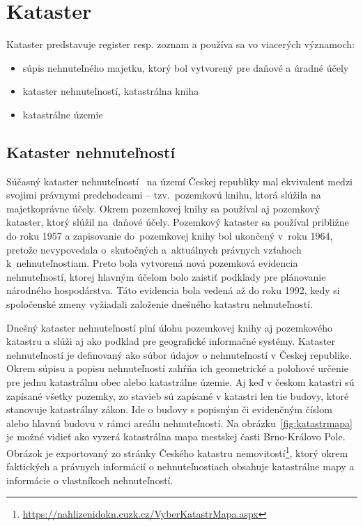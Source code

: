 \section{Kataster}
Kataster predstavuje register resp. zoznam a používa sa vo viacerých významoch:
\begin{itemize}
    \item súpis nehnuteľného majetku, ktorý bol vytvorený pre daňové a úradné účely
    \item kataster nehnuteľností, katastrálna kniha
    \item katastrálne územie
\end{itemize}

\subsection{Kataster nehnuteľností}
Súčasný kataster nehnuteľností~\cite{baudys-katastranemovitosti} na území Českej republiky mal ekvivalent medzi svojimi právnymi predchodcami \--- tzv.~pozemkovú knihu, ktorá slúžila na majetkoprávne účely. Okrem pozemkovej knihy sa používal aj pozemkový kataster, ktorý slúžil na~daňové účely. Pozemkový kataster sa používal približne do roku 1957 a zapisovanie do~pozemkovej knihy bol ukončený v~roku 1964, pretože nevypovedala o~skutočných a~aktuálnych právnych vzťahoch k~nehnuteľnostiam. Preto bola vytvorená nová pozemková evidencia nehnuteľností, ktorej hlavným účelom bolo zaistiť podklady pre plánovanie národného hospodárstva. Táto evidencia bola vedená až do roku 1992, kedy si spoločenské zmeny vyžiadali založenie dnešného katastru nehnuteľností.

Dnešný kataster nehnuteľností plní úlohu pozemkovej knihy aj pozemkového katastru a slúži aj ako podklad pre geografické informačné systémy. Kataster nehnuteľností je definovaný ako súbor údajov o nehnuteľností v Českej republike. Okrem súpisu a popisu nehnuteľností zahŕňa ich geometrické a polohové určenie pre jednu katastrálnu obec alebo katastrálne územie. Aj keď v českom katastri sú zapísané všetky pozemky, zo stavieb sú zapísané v katastri len tie budovy, ktoré stanovuje katastrálny zákon. Ide o budovy s popisným či evidenčným číslom alebo hlavnú budovu v rámci areálu nehnuteľností. Na obrázku~\ref{fig:katastrmapa} je možné vidieť ako vyzerá katastrálna mapa mestskej časti Brno-Královo Pole. Obrázok je exportovaný zo stránky Českého katastru nemovitostí\footnote{\url{https://nahlizenidokn.cuzk.cz/VyberKatastrMapa.aspx}}, ktorý okrem faktických a právnych informácií o nehnuteľnostiach obsahuje katastrálne mapy a informácie o vlastníkoch nehnuteľností.

